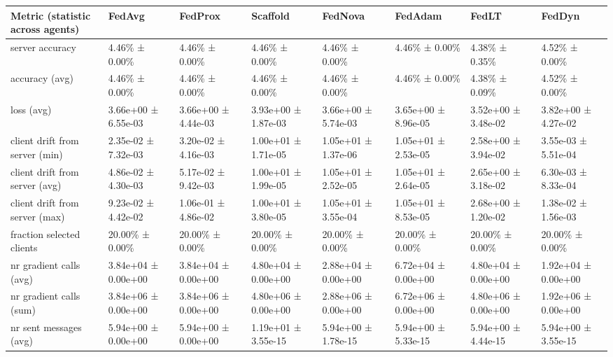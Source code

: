 \begin{tabular}{llllllll}
\hline
 Metric (statistic across agents)   & FedAvg              & FedProx             & Scaffold            & FedNova             & FedAdam             & FedLT               & FedDyn              \\
\hline
 server accuracy                    & 4.46\% ± 0.00\%       & 4.46\% ± 0.00\%       & 4.46\% ± 0.00\%       & 4.46\% ± 0.00\%       & 4.46\% ± 0.00\%       & 4.38\% ± 0.35\%       & 4.52\% ± 0.00\%       \\
 accuracy (avg)                     & 4.46\% ± 0.00\%       & 4.46\% ± 0.00\%       & 4.46\% ± 0.00\%       & 4.46\% ± 0.00\%       & 4.46\% ± 0.00\%       & 4.38\% ± 0.09\%       & 4.52\% ± 0.00\%       \\
 loss (avg)                         & 3.66e+00 ± 6.55e-03 & 3.66e+00 ± 4.44e-03 & 3.93e+00 ± 1.87e-03 & 3.66e+00 ± 5.74e-03 & 3.65e+00 ± 8.96e-05 & 3.52e+00 ± 3.48e-02 & 3.82e+00 ± 4.27e-02 \\
 client drift from server (min)     & 2.35e-02 ± 7.32e-03 & 3.20e-02 ± 4.16e-03 & 1.00e+01 ± 1.71e-05 & 1.05e+01 ± 1.37e-06 & 1.05e+01 ± 2.53e-05 & 2.58e+00 ± 3.94e-02 & 3.55e-03 ± 5.51e-04 \\
 client drift from server (avg)     & 4.86e-02 ± 4.30e-03 & 5.17e-02 ± 9.42e-03 & 1.00e+01 ± 1.99e-05 & 1.05e+01 ± 2.52e-05 & 1.05e+01 ± 2.64e-05 & 2.65e+00 ± 3.18e-02 & 6.30e-03 ± 8.33e-04 \\
 client drift from server (max)     & 9.23e-02 ± 4.42e-02 & 1.06e-01 ± 4.86e-02 & 1.00e+01 ± 3.80e-05 & 1.05e+01 ± 3.55e-04 & 1.05e+01 ± 8.53e-05 & 2.68e+00 ± 1.20e-02 & 1.38e-02 ± 1.56e-03 \\
 fraction selected clients          & 20.00\% ± 0.00\%      & 20.00\% ± 0.00\%      & 20.00\% ± 0.00\%      & 20.00\% ± 0.00\%      & 20.00\% ± 0.00\%      & 20.00\% ± 0.00\%      & 20.00\% ± 0.00\%      \\
 nr gradient calls (avg)            & 3.84e+04 ± 0.00e+00 & 3.84e+04 ± 0.00e+00 & 4.80e+04 ± 0.00e+00 & 2.88e+04 ± 0.00e+00 & 6.72e+04 ± 0.00e+00 & 4.80e+04 ± 0.00e+00 & 1.92e+04 ± 0.00e+00 \\
 nr gradient calls (sum)            & 3.84e+06 ± 0.00e+00 & 3.84e+06 ± 0.00e+00 & 4.80e+06 ± 0.00e+00 & 2.88e+06 ± 0.00e+00 & 6.72e+06 ± 0.00e+00 & 4.80e+06 ± 0.00e+00 & 1.92e+06 ± 0.00e+00 \\
 nr sent messages (avg)             & 5.94e+00 ± 0.00e+00 & 5.94e+00 ± 0.00e+00 & 1.19e+01 ± 3.55e-15 & 5.94e+00 ± 1.78e-15 & 5.94e+00 ± 5.33e-15 & 5.94e+00 ± 4.44e-15 & 5.94e+00 ± 3.55e-15 \\

\end{tabular}
